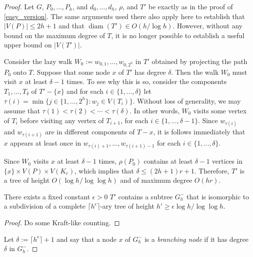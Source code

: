 \documentclass{patmorin}
\newcommand{\defin}[1]{\emph{\color{brightmaroon}#1}}
\DeclareMathOperator{\diam}{diam}
\begin{document}

\begin{proof}
  Let $G$, $P_0,\ldots,P_h$, and $d_0,\ldots,d_h$, $\rho$, and $T'$ be exactly as in the proof of \cref{easy_version}.  The same arguments used there also apply here to establish that $|V(P)|\le 2h+1$ and that $\diam(T')\in O(h/\log h)$.  However, without any bound on the maximum degree of $T$, it is no longer possible to establish a useful upper bound on $|V(T')|$.

  Consider the lazy walk $W_0:=w_{0,1},\ldots,w_{0,2^h}$ in $T'$ obtained by projecting the path $P_0$ onto $T$.  Suppose that some node $x$ of $T'$ has degree $\delta$.  Then the walk $W_0$ must visit $x$ at least $\delta-1$ times.  To see why this is so, consider the components $T_1,\ldots,T_\delta$ of $T'-\{x\}$ and for each $i\in\{1,\ldots,\delta\}$ let $\tau(i)=\min\{j\in \{1,\ldots,2^h\}: w_j\in V(T_i)\}$.  Without loss of generality, we may assume that $\tau(1) < \tau(2) <\cdots < \tau(\delta)$.  In other words, $W_0$ visits some vertex of $T_i$ before visiting any vertex of $T_{i+1}$, for each $i\in\{1,\ldots,\delta-1\}$.  Since $w_{\tau(i)}$ and $w_{\tau(i+1)}$ are in different components of $T-x$, it is follows immediately that $x$ appears at least once in $w_{\tau(i)+1},\ldots,w_{\tau(i+1)-1}$ for each $i\in\{1,\ldots,\delta\}$.

  Since $W_0$ visits $x$ at least $\delta-1$ times, $\rho(P_0)$ contains at least $\delta-1$ vertices in $\{x\}\times V(P)\times V(K_r)$, which implies that $\delta \le (2h+1)r + 1$.  Therefore, $T'$ is a tree of height $O(\log h/\log\log h)$ and of maximum degree $O(hr)$.

  \begin{clm}\label{big_logeps_subdivision}
    There exists a fixed constant $\epsilon >0$
    $T'$ contains a subtree $G_h^-$ that is isomorphic to a subdivision of a complete $\lceil h^\epsilon\rceil$-ary tree of height $h'\ge\epsilon\log h/\log\log h$.
  \end{clm}

  \begin{proof}
    Do some Kraft-like counting.
  \end{proof}

  Let $\delta:=\lceil h^{\epsilon}\rceil+1$ and say that a node $x$ of $G_h^-$ is a \defin{branching node} if it has degree $\delta$ in $G_h^-$.


\end{proof}
\end{document}
